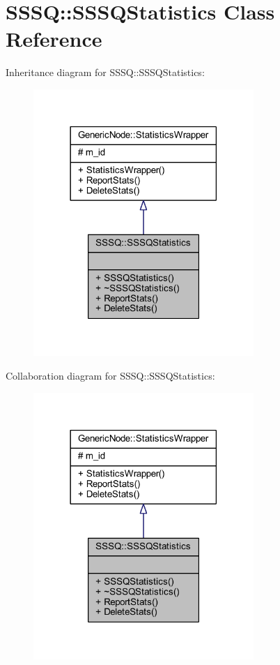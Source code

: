 \hypertarget{class_s_s_s_q_1_1_s_s_s_q_statistics}{}\section{S\+S\+SQ\+:\+:S\+S\+S\+Q\+Statistics Class Reference}
\label{class_s_s_s_q_1_1_s_s_s_q_statistics}


Inheritance diagram for S\+S\+SQ\+:\+:S\+S\+S\+Q\+Statistics\+:
\nopagebreak
\begin{figure}[H]
\begin{center}
\leavevmode
\includegraphics[width=237pt]{class_s_s_s_q_1_1_s_s_s_q_statistics__inherit__graph}
\end{center}
\end{figure}


Collaboration diagram for S\+S\+SQ\+:\+:S\+S\+S\+Q\+Statistics\+:
\nopagebreak
\begin{figure}[H]
\begin{center}
\leavevmode
\includegraphics[width=237pt]{class_s_s_s_q_1_1_s_s_s_q_statistics__coll__graph}
\end{center}
\end{figure}
